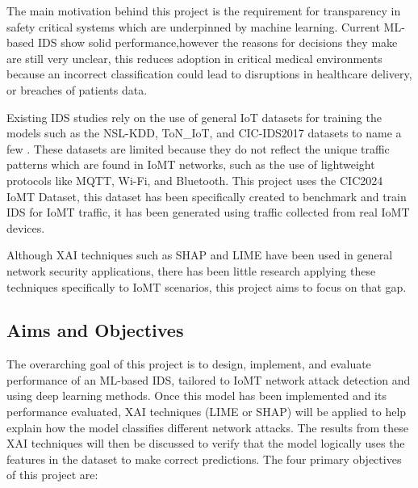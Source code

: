 \documentclass[11pt,a4paper]{article}
\begin{document}
The main motivation behind this project is the requirement for transparency in safety critical systems which are underpinned by machine learning. Current ML-based IDS show solid performance,however the reasons for decisions they make are still very unclear, this reduces adoption in critical medical environments because an incorrect classification could lead to disruptions in healthcare delivery, or breaches of patients data.

Existing IDS studies rely on the use of general IoT datasets for training the models such as the NSL-KDD, ToN\_IoT, and CIC-IDS2017 datasets to name a few \cite{nslkdddataset, toniotdataset,cicids2017dataset}. These datasets are limited because they do not reflect the unique traffic patterns which are found in IoMT networks, such as the use of lightweight protocols like MQTT, Wi-Fi, and Bluetooth. This project uses the CIC2024 IoMT Dataset, this dataset has been specifically created to benchmark and train IDS for IoMT traffic, it has been generated using traffic collected from real IoMT devices.

Although XAI techniques such as SHAP and LIME have been used in general network security applications, there has been little research applying these techniques specifically to IoMT scenarios, this project aims to focus on that gap.

\subsection{Aims and Objectives}
The overarching goal of this project is to design, implement, and evaluate performance of an ML-based IDS, tailored to IoMT network attack detection and using deep learning methods. Once this model has been implemented and its performance evaluated, XAI techniques (LIME or SHAP) will be applied to help explain how the model classifies different network attacks. The results from these XAI techniques will then be discussed to verify that the model logically uses the features in the dataset to make correct predictions. The four primary objectives of this project are:
\end{document}
